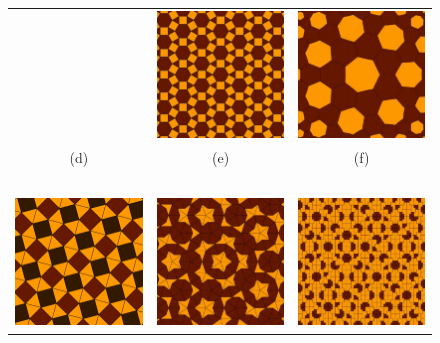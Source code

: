 \documentclass[%
 reprint,
 showpacs,
 showkeys,
 amsmath,
 amssymb,
 aps,
 pra,
 longbibliography,
 floatfix,
 ]{revtex4-1}
\begin{document}
\begin{figure}
\begin{center}
\begin{tabular}{ccc}
&
 \includegraphics[width=5.00cm]{2008-ae-tess}
&
 \includegraphics[width=5.00cm]{2008-ae-tess2}
\\
(d)&(e)&(f)\\
$\;$\\
 \includegraphics[width=5.00cm]{2008-ae-tess3}
&
 \includegraphics[width=5.00cm]{2008-ae-penrose}
&
 \includegraphics[width=5.00cm]{2008-ae-ammann}

\end{tabular}
\end{center}
\end{figure}
\end{document}
